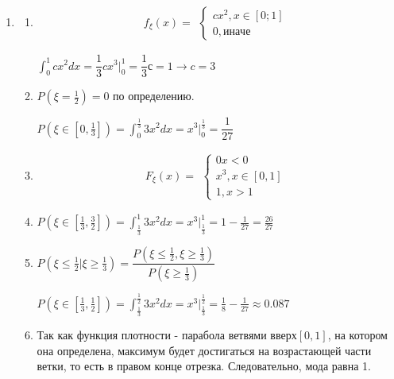 \begin{enumerate}
\begin{enumerate}
\begin{center}
\begin{tabular}{|c|c|c|}
		
	\end{tabular}


\end{center}

\end{enumerate}



\item 

\begin{enumerate}
		\item
	\begin{equation*}
	f_\xi(x) = 
	\begin{aligned}
	\begin{cases*}
	cx^2 , x \in [0;1] \\
	0 , иначе
	\end{cases*} 
	\end{aligned} 
	\end{equation*}
	
$ \int_{0}^{1}cx^2 dx= \dfrac{1}{3}cx^3\bigg|_0^1 = \dfrac{1}{3} с = 1 \to c = 3 $
\item 
$ P(\xi = \frac{1}{2}) = 0 $ по определению.

$ P(\xi \in [0, \frac{1}{3}]) = \int_{0}^{\frac{1}{3}} 3x^2 dx = x^3 \bigg|_0^{\frac{1}{3}}  = \dfrac{1}{27}$
\item 
	\begin{equation*}
F_\xi(x) = 
\begin{aligned}
\begin{cases*}
0 x < 0\\
x^3, x \in [0, 1]\\
1, x > 1
\end{cases*} 
\end{aligned} 
\end{equation*}

\item
$ P(\xi \in [\frac{1}{3}, \frac{3}{2}]) = \int_{\frac{1}{3}}^{1} 3x^2 dx = x^3 \bigg|_\frac{1}{3}^{1}  = 1 - \frac{1}{27} = \frac{26}{27}$

\item
$ P(\xi \le \frac{1}{2} |  \xi \ge \frac{1}{3}) = \dfrac{P(\xi \le \frac{1}{2} ,  \xi \ge \frac{1}{3})}{  P(\xi \ge \frac{1}{3})}$

$ P(\xi \in [\frac{1}{3}, \frac{1}{2}])  = \int_{\frac{1}{3}}^{\frac{1}{2}} 3x^2 dx = x^3 \bigg|_\frac{1}{3}^{\frac{1}{2}} = \frac{1}{8} - \frac{1}{27} \approx 0.087 $

\item 
Так как функция плотности - парабола ветвями вверх$ [0, 1] $, на котором она определена, максимум будет достигаться на возрастающей части ветки, то есть в правом конце отрезка. Следовательно, мода равна 1.


\end{enumerate}
\end{enumerate}
